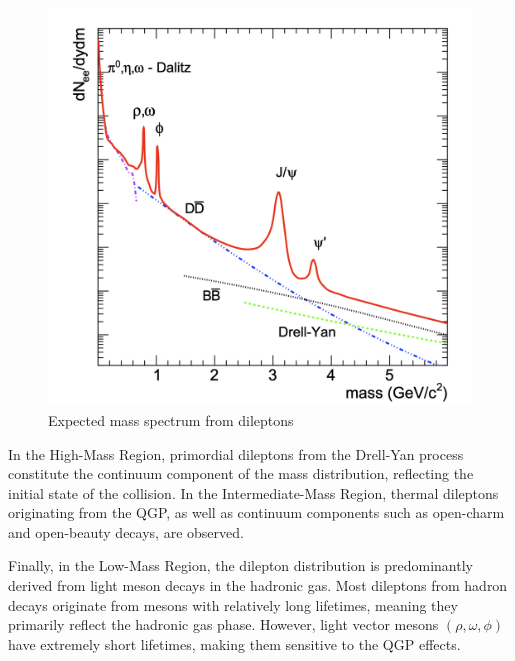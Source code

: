         \begin{figure}[hbtp]
            \centering
            \includegraphics[keepaspectratio, scale=0.3]{fig/1_6_expected_dileptonMass.png}
            \caption{Expected mass spectrum from dileptons\cite{Rapp:1999ej}}
            \label{Intro:Dilepton:dilepton_mass}
        \end{figure}      
        In the High-Mass Region, primordial dileptons from the Drell-Yan process constitute the continuum component of the mass distribution, reflecting the initial state of the collision. In the Intermediate-Mass Region, thermal dileptons originating from the QGP, as well as continuum components such as open-charm and open-beauty decays, are observed. 
        
        Finally, in the Low-Mass Region, the dilepton distribution is predominantly derived from light meson decays in the hadronic gas. Most dileptons from hadron decays originate from mesons with relatively long lifetimes, meaning they primarily reflect the hadronic gas phase. However, light vector mesons $(\rho, \omega, \phi)$ have extremely short lifetimes, making them sensitive to the QGP effects.\@
